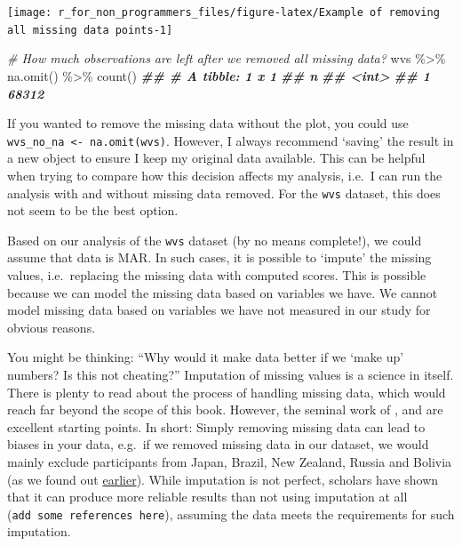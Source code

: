 \documentclass[
]{book}
\newenvironment{Shaded}{\begin{snugshade}}{\end{snugshade}}
\newcommand{\CommentTok}[1]{\textcolor[rgb]{0.56,0.35,0.01}{\textit{#1}}}
\newcommand{\DocumentationTok}[1]{\textcolor[rgb]{0.56,0.35,0.01}{\textbf{\textit{#1}}}}
\newcommand{\FunctionTok}[1]{\textcolor[rgb]{0.00,0.00,0.00}{#1}}
\newcommand{\NormalTok}[1]{#1}
\newcommand{\SpecialCharTok}[1]{\textcolor[rgb]{0.00,0.00,0.00}{#1}}
\begin{document}
\begin{center}\texttt{[image: r\_for\_non\_programmers\_files/figure-latex/Example of removing all missing data points-1]} \end{center}

\begin{Shaded}
\begin{Highlighting}[]

\CommentTok{\# How much observations are left after we removed all missing data?}
\NormalTok{wvs }\SpecialCharTok{\%\textgreater{}\%} \FunctionTok{na.omit}\NormalTok{() }\SpecialCharTok{\%\textgreater{}\%} \FunctionTok{count}\NormalTok{()}
\DocumentationTok{\#\# \# A tibble: 1 x 1}
\DocumentationTok{\#\#       n}
\DocumentationTok{\#\#   \textless{}int\textgreater{}}
\DocumentationTok{\#\# 1 68312}
\end{Highlighting}
\end{Shaded}

If you wanted to remove the missing data without the plot, you could use \texttt{wvs\_no\_na\ \textless{}-\ na.omit(wvs)}. However, I always recommend `saving' the result in a new object to ensure I keep my original data available. This can be helpful when trying to compare how this decision affects my analysis, i.e.~I can run the analysis with and without missing data removed. For the \texttt{wvs} dataset, this does not seem to be the best option.

Based on our analysis of the \texttt{wvs} dataset (by no means complete!), we could assume that data is MAR. In such cases, it is possible to `impute' the missing values, i.e.~replacing the missing data with computed scores. This is possible because we can model the missing data based on variables we have. We cannot model missing data based on variables we have not measured in our study for obvious reasons.

You might be thinking: ``Why would it make data better if we `make up' numbers? Is this not cheating?'' Imputation of missing values is a science in itself. There is plenty to read about the process of handling missing data, which would reach far beyond the scope of this book. However, the seminal work of \citet{van-buuren-2018}, \citet{dong-et-al-2013} and \citet{jakobsen-et-al-2017} are excellent starting points. In short: Simply removing missing data can lead to biases in your data, e.g.~if we removed missing data in our dataset, we would mainly exclude participants from Japan, Brazil, New Zealand, Russia and Bolivia (as we found out \protect\hyperlink{missing-data-by-country-table}{earlier}). While imputation is not perfect, scholars have shown that it can produce more reliable results than not using imputation at all (\texttt{add\ some\ references\ here}), assuming the data meets the requirements for such imputation.
\end{document}
